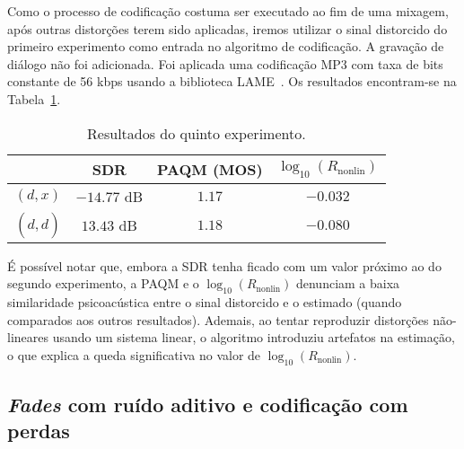 Como o processo de codificação costuma ser executado ao fim de uma mixagem, após outras distorções terem sido aplicadas, iremos utilizar o sinal distorcido do primeiro experimento como entrada no algoritmo de codificação. A gravação de diálogo não foi adicionada. Foi aplicada uma codificação MP3 com taxa de bits constante de 56 kbps usando a biblioteca LAME~\cite{lame-encoder}. Os resultados encontram-se na Tabela~\ref{tab:wf:experiment-5}.
{\def\arraystretch{1.25}\tabcolsep=10pt
\begin{table}[!ht]
    \centering
    \caption[Resultados do quinto experimento: \textit{fades} e codificação com perdas]{Resultados do quinto experimento.}
    \label{tab:wf:experiment-5}
    \begin{tabular}{cccc}
        \toprule
                         & SDR        & PAQM (MOS)   & $\log_{10}(R_{\text{nonlin}})$ \\
        \midrule
        $(d, x)$       & $-14.77$ dB & $1.17$  & $-0.032$                 \\
        $(d, \hat{d})$ & $13.43$ dB & $1.18$ & $-0.080$                \\ \bottomrule
    \end{tabular}
\end{table}
}

É possível notar que, embora a SDR tenha ficado com um valor próximo ao do segundo experimento, a PAQM e o $\log_{10}(R_{\text{nonlin}})$ denunciam a baixa similaridade psicoacústica entre o sinal distorcido e o estimado (quando comparados aos outros resultados). Ademais, ao tentar reproduzir distorções não-lineares usando um sistema linear, o algoritmo introduziu artefatos na estimação, o que explica a queda significativa no valor de $\log_{10}(R_{\text{nonlin}})$.

\subsection{\textit{Fades} com ruído aditivo e codificação com perdas}
\label{subsec:wiener:experiment-6}

